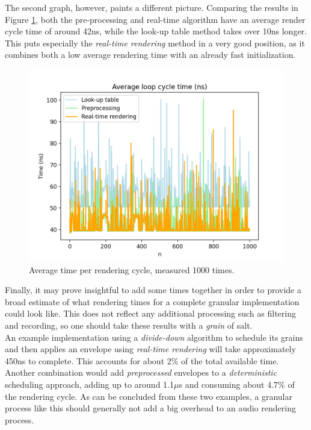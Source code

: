 \documentclass[10pt, twocolumn]{IEEEtran}
\begin{document}
The second graph, however, paints a different picture. Comparing the results in Figure \ref{fig:env_average_cycle_time}, both the pre-processing and real-time algorithm have an average render cycle time of around 42ns, while the look-up table method takes over 10ns longer. This puts especially the \textit{real-time rendering} method in a very good position, as it combines both a low average rendering time with an already fast initialization.
\begin{figure}[ht!]
	\includegraphics[width=\linewidth]{env_average_cycle_time.png}
	\caption{Average time per rendering cycle, measured 1000 times.}
	\label{fig:env_average_cycle_time}
\end{figure}

Finally, it may prove insightful to add some times together in order to provide a broad estimate of what rendering times for a complete granular implementation could look like. This does not reflect any additional processing such as filtering and recording, so one should take these results with a \textit{grain} of salt.\\
An example implementation using a \textit{divide-down} algorithm to schedule its grains and then applies an envelope using \textit{real-time rendering} will take approximately 450ns to complete. This accounts for about 2\% of the total available time. Another combination would add \textit{preprocessed} envelopes to a \textit{deterministic} scheduling approach, adding up to around 1.1$\mu$s and consuming about 4.7\% of the rendering cycle. As can be concluded from these two examples, a granular process like this should generally not add a big overhead to an audio rendering process.
\end{document}
